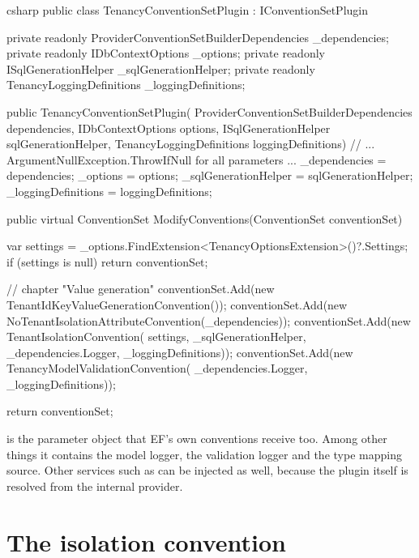 \begin{sourcecode}{csharp}
public class TenancyConventionSetPlugin : IConventionSetPlugin
{
    private readonly ProviderConventionSetBuilderDependencies _dependencies;
    private readonly IDbContextOptions _options;
    private readonly ISqlGenerationHelper _sqlGenerationHelper;
    private readonly TenancyLoggingDefinitions _loggingDefinitions;

    public TenancyConventionSetPlugin(
        ProviderConventionSetBuilderDependencies dependencies,
        IDbContextOptions options,
        ISqlGenerationHelper sqlGenerationHelper,
        TenancyLoggingDefinitions loggingDefinitions)
    {
        // ... ArgumentNullException.ThrowIfNull for all parameters ...
        _dependencies = dependencies;
        _options = options;
        _sqlGenerationHelper = sqlGenerationHelper;
        _loggingDefinitions = loggingDefinitions;
    }

    public virtual ConventionSet ModifyConventions(ConventionSet conventionSet)
    {
        var settings = _options.FindExtension<TenancyOptionsExtension>()?.Settings;
        if (settings is null)
            return conventionSet;

        // chapter "Value generation"
        conventionSet.Add(new TenantIdKeyValueGenerationConvention());
        conventionSet.Add(new NoTenantIsolationAttributeConvention(_dependencies));
        conventionSet.Add(new TenantIsolationConvention(
            settings, _sqlGenerationHelper, _dependencies.Logger, _loggingDefinitions));
        conventionSet.Add(new TenancyModelValidationConvention(
            _dependencies.Logger, _loggingDefinitions));

        return conventionSet;
    }
}
\end{sourcecode}

is the parameter object that EF's own conventions receive too. Among other things it
contains the model logger, the validation logger and the type mapping source. Other services
such as  can be injected as well,
because the plugin itself is resolved from the internal provider.

\section{The isolation convention}

